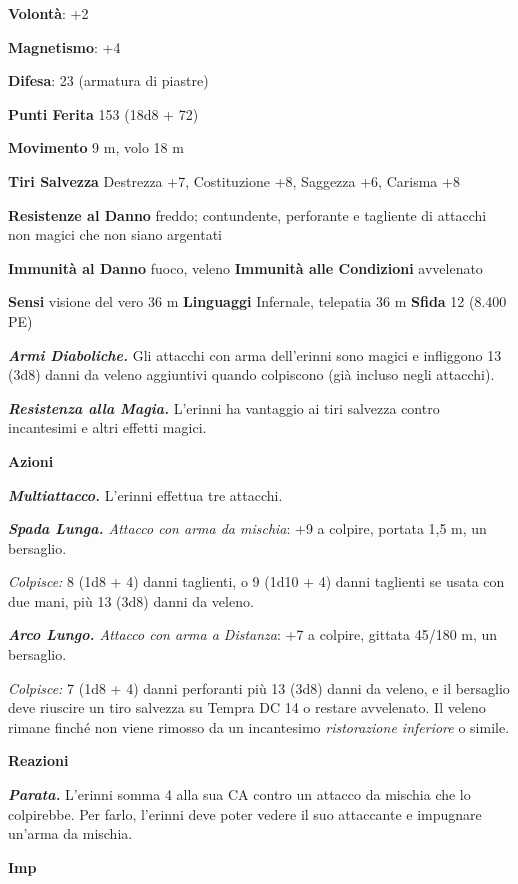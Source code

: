 \begin{multicols}{2}
\textbf{Volontà}: +2

\textbf{Magnetismo}: +4

\textbf{Difesa}: 23 (armatura di piastre)

\textbf{Punti Ferita} 153 (18d8 + 72)

\textbf{Movimento} 9 m, volo 18 m

\textbf{Tiri Salvezza} Destrezza +7, Costituzione +8, Saggezza +6,
Carisma +8

\textbf{Resistenze al Danno} freddo; contundente, perforante e tagliente
di attacchi non magici che non siano argentati

\textbf{Immunità al Danno} fuoco, veleno \textbf{Immunità alle
Condizioni} avvelenato

\textbf{Sensi} visione del vero 36 m
\textbf{Linguaggi} Infernale, telepatia 36 m \textbf{Sfida} 12 (8.400
PE)

\emph{\textbf{Armi Diaboliche.}} Gli attacchi con arma dell'erinni sono
magici e infliggono 13 (3d8) danni da veleno aggiuntivi quando
colpiscono (già incluso negli attacchi).

\emph{\textbf{Resistenza alla Magia.}} L'erinni ha vantaggio ai tiri
salvezza contro incantesimi e altri effetti magici.

\textbf{Azioni}

\emph{\textbf{Multiattacco.}} L'erinni effettua tre attacchi.

\emph{\textbf{Spada Lunga.} Attacco con arma da mischia}: +9 a colpire,
portata 1,5 m, un bersaglio.

\emph{Colpisce:} 8 (1d8 + 4) danni taglienti, o 9 (1d10 + 4) danni
taglienti se usata con due mani, più 13 (3d8) danni da veleno.

\emph{\textbf{Arco Lungo.} Attacco con arma a Distanza}: +7 a colpire,
gittata 45/180 m, un bersaglio.

\emph{Colpisce:} 7 (1d8 + 4) danni perforanti più 13 (3d8) danni da
veleno, e il bersaglio deve riuscire un tiro salvezza su Tempra DC
14 o restare avvelenato. Il veleno rimane finché non viene rimosso da un
incantesimo \emph{ristorazione inferiore} o simile.

\textbf{Reazioni}

\emph{\textbf{Parata.}} L'erinni somma 4 alla sua CA contro un attacco
da mischia che lo colpirebbe. Per farlo, l'erinni deve poter vedere il
suo attaccante e impugnare un'arma da mischia.



\textbf{Imp}


\end{multicols}

